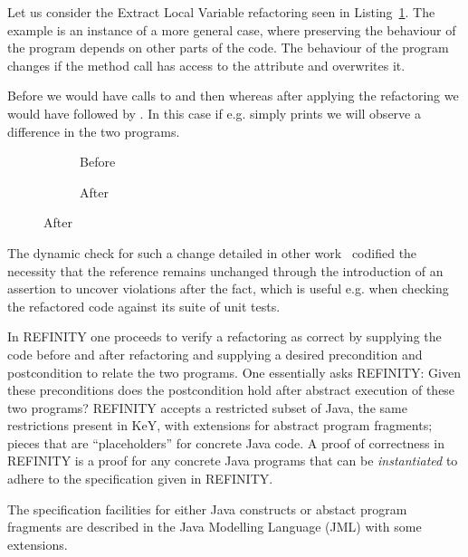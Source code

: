 Let us consider the Extract Local Variable refactoring seen in Listing~\ref{lst:ExtractVariable-java}.
The example is an instance of a more general case, where preserving the behaviour of the program depends on other parts of the code.
The behaviour of the program changes if the method call  has access to the attribute  and overwrites it.

Before we would have calls to  and then  whereas after applying the refactoring we would
have  followed by . In this case if e.g.  simply prints  we will
observe a difference in the two programs.

\begin{figure}[!h]
  \centering
  \begin{subfigure}{.2\linewidth}
    
    \caption{Before}
  \end{subfigure}\hspace{1cm}
  \begin{subfigure}{.3\linewidth}
    
    \caption{After}
  \end{subfigure}
\label{lst:ExtractVariable-java}
\end{figure}

The dynamic check for such a change detailed in other work~\cite{stolz:isolarefa} codified the necessity that the reference 
remains unchanged through the introduction of an assertion  to uncover violations after the fact,
which is useful e.g. when checking the refactored code against its suite of unit tests.

In REFINITY one proceeds to verify a refactoring as correct by supplying the code before and after refactoring and supplying a desired precondition and postcondition to relate
the two programs. One essentially asks REFINITY: Given these preconditions does the postcondition hold after abstract execution of these two programs? REFINITY accepts a restricted
subset of Java, the same restrictions present in KeY, with extensions for abstract program fragments; pieces that are ``placeholders'' for concrete Java code.
A proof of correctness in REFINITY is a proof for any concrete Java programs that can be \emph{instantiated} to adhere to the specification given in REFINITY.

The specification facilities for either Java constructs or abstact program fragments are described in the Java Modelling Language (JML) with some extensions.

